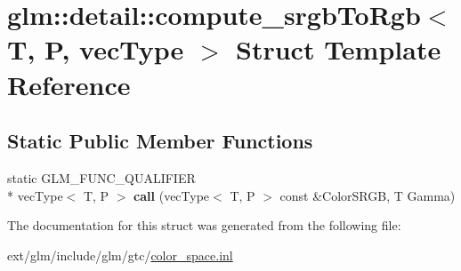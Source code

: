 \hypertarget{structglm_1_1detail_1_1compute__srgb_to_rgb}{\section{glm\-:\-:detail\-:\-:compute\-\_\-srgb\-To\-Rgb$<$ T, P, vec\-Type $>$ Struct Template Reference}
\label{structglm_1_1detail_1_1compute__srgb_to_rgb}
}
\subsection*{Static Public Member Functions}
\begin{DoxyCompactItemize}
\item 
\hypertarget{structglm_1_1detail_1_1compute__srgb_to_rgb_a73d176e6c80940ded57f4e76dc362f72}{static G\-L\-M\-\_\-\-F\-U\-N\-C\-\_\-\-Q\-U\-A\-L\-I\-F\-I\-E\-R \\*
vec\-Type$<$ T, P $>$ {\bfseries call} (vec\-Type$<$ T, P $>$ const \&Color\-S\-R\-G\-B, T Gamma)}\label{structglm_1_1detail_1_1compute__srgb_to_rgb_a73d176e6c80940ded57f4e76dc362f72}

\end{DoxyCompactItemize}


The documentation for this struct was generated from the following file\-:\begin{DoxyCompactItemize}
\item 
ext/glm/include/glm/gtc/\hyperlink{gtc_2color__space_8inl}{color\-\_\-space.\-inl}\end{DoxyCompactItemize}

